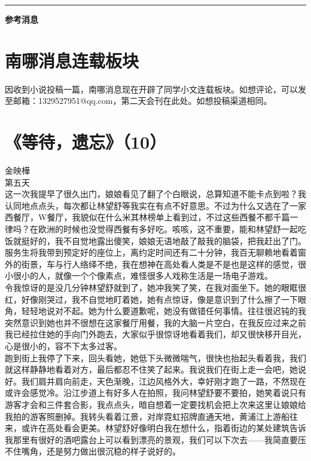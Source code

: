 \documentclass[letterpaper, 12pt]{article}
\begin{document}
\hrule
\vspace{4mm}
\centerline{\huge\textbf{参考消息}}
\begin{multicols}{2}
\section{南哪消息连载板块}
因收到小说投稿一篇，南哪消息现在开辟了同学小文连载板块。如想评论，可以发至邮箱：1329527951@qq.com，第二天会刊在此处。如想投稿渠道相同。
\section{《等待，遗忘》（10）}
金映樺\\
\newCJKfontfamily{}\fan
第五天\\

这一次我提早了很久出门，娘娘看见了翻了个白眼说，总算知道不能卡点到啦？我认同地点点头，每次都让林望舒等我实在有点不好意思。不过为什么又选在了一家西餐厅，W餐厅，我貌似在什么米其林榜单上看到过，不过这些西餐不都千篇一律吗？在欧洲的时候也没觉得西餐有多好吃。咳咳，这不重要，能和林望舒一起吃饭就挺好的，我不自觉地露出傻笑，娘娘无语地敲了敲我的脑袋，把我赶出了门。\\

服务生将我带到预定好的座位上，离约定时间还有二十分钟，我百无聊赖地看着窗外的街景，车与行人络绎不绝，我在想神在高处看人类是不是也是这样的感觉，很小很小的人，就像一个个像素点，难怪很多人戏称生活是一场电子游戏。\\

令我惊讶的是没几分钟林望舒就到了，她冲我笑了笑，在我对面坐下。她的眼眶很红，好像刚哭过，我不自觉地盯着她，她有点惊讶，像是意识到了什么擦了一下眼角，轻轻地说对不起。她为什么要道歉呢，她没有做错任何事情。往往很迟钝的我突然意识到她也并不很想在这家餐厅用餐，我的大脑一片空白，在我反应过来之前我已经拉住她的手向门外跑去，大家似乎很惊讶地看着我们，却又很快移开目光，心是很小的，容不下太多过客。\\

跑到街上我停了下来，回头看她，她低下头微微喘气，很快也抬起头看着我，我们就这样静静地看着对方，最后都忍不住笑了起来。我说我们在街上走一会吧，她说好。我们肩并肩向前走，天色渐晚，江边风格外大，幸好刚才跑了一路，不然现在或许会感觉冷。沿江步道上有好多人在拍照，我问林望舒要不要拍，她笑着说只有游客才会和三件套合影，我点点头，暗自想着一定要找机会把上次来这里让娘娘给我拍的游客照删掉。我转头看着江景，对岸霓虹招牌直通天地，黄浦江上游船往来，或许在高处看会更美。林望舒好像明白我在想什么，指着街边的某处建筑告诉我那里有很好的酒吧露台上可以看到漂亮的景观，我们可以下次去——我简直要压不住嘴角，还是努力做出很沉稳的样子说好的。\\


\end{multicols}
\end{document}
